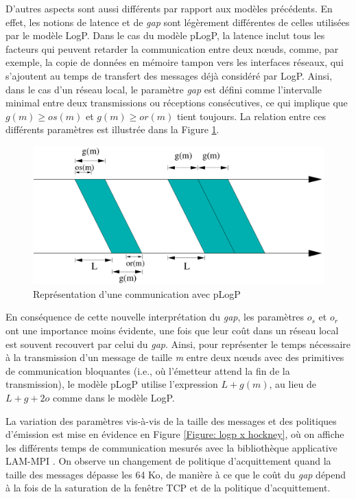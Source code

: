 D'autres aspects sont aussi différents par rapport aux modèles précédents.
En effet, les notions de latence et de \emph{gap} sont légèrement
différentes de celles utilisées par le modèle LogP. Dans le
cas du modèle pLogP, la latence inclut tous les facteurs qui peuvent
retarder la communication entre deux n{\oe}uds, comme, par exemple,
la copie de données en mémoire tampon vers les interfaces réseaux,
qui s'ajoutent au temps de transfert des messages déjà considéré par
LogP. Ainsi, dans le cas d'un réseau local, le paramètre \emph{gap}
est défini comme l'intervalle minimal entre deux transmissions ou
réceptions consécutives, ce qui implique que $g(m)\geq os(m)$ et
$g(m)\geq or(m)$ tient toujours. La relation entre ces différents
paramètres est illustrée dans la Figure \ref{Figure: pLogP}. 

%
\begin{figure}[h]
\centering
\includegraphics[width=0.7\linewidth]{images/p2p/plogp-struct}

\caption{\label{Figure: pLogP}Représentation d'une communication avec pLogP}

\end{figure}


En conséquence de cette nouvelle interprétation du \emph{gap}, les
paramètres $o_{s}$ et $o_{r}$ ont une importance moins évidente,
une fois que leur coût dans un réseau local est souvent recouvert
par celui du \textit{gap}.  Ainsi, pour représenter le temps nécessaire à la transmission d'un
message de taille \emph{m} entre deux n{\oe}uds avec des primitives de
communication bloquantes (i.e., où l'émetteur attend la fin de la transmission), le modèle pLogP utilise l'expression $L+g(m)$,
au lieu de $L+g+2o$ comme dans le modèle LogP. 


La variation des paramètres vis-à-vis de la taille des messages et des politiques d'émission est mise en évidence en Figure \ref{Figure: logp x hockney}, où on affiche les différents temps de communication mesurés avec la bibliothèque applicative LAM-MPI \cite{LAM04}. On observe un
changement de politique d'acquittement quand la taille des messages dépasse les 64 Ko, de manière à ce que le coût du \textit{gap} dépend à la fois
de la saturation de la fenêtre TCP et de la politique d'acquittement.

